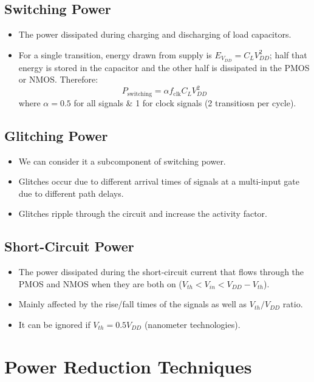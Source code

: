 \documentclass[11pt]{article}
\begin{document}
\subsection*{Switching Power}
\begin{itemize}
    \item The power dissipated during charging and discharging of load capacitors.
    \item For a single transition, energy drawn from supply is $E_{V_{DD}}=C_LV_{DD}^2$; half that energy is stored in the capacitor and the other half is dissipated in the PMOS or NMOS. Therefore:
    \begin{equation*}
        P_{\text{switching}}=\alpha f_{\text{clk}}C_LV_{DD}^2
    \end{equation*}
    where $\alpha=0.5$ for all signals \& 1 for clock signals (2 transitiosn per cycle).
\end{itemize}
\subsection*{Glitching Power}
\begin{itemize}
    \item We can consider it a subcomponent of switching power.
    \item Glitches occur due to different arrival times of signals at a multi-input gate due to different path delays.
    \item Glitches ripple through the circuit and increase the activity factor.
\end{itemize}
\subsection*{Short-Circuit Power}
\begin{itemize}
    \item The power dissipated during the short-circuit current that flows through the PMOS and NMOS when they are both on ($V_{th} < V_{in} < V_{DD}-V_{th}$).
    \item Mainly affected by the rise/fall times of the signals as well as $V_{th}/V_{DD}$ ratio.
    \item It can be ignored if $V_{th}=0.5V_{DD}$ (nanometer technologies).
\end{itemize}

\section*{Power Reduction Techniques}
\end{document}
